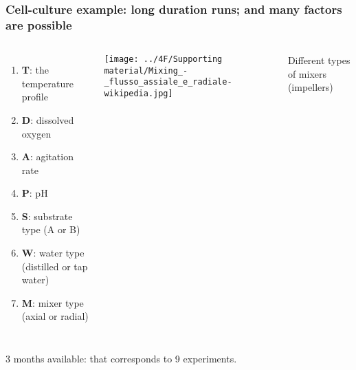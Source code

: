 \documentclass[11pt,aspectratio=169,mathserif]{beamer}
\begin{document}
\begin{frame}\frametitle{Cell-culture example: long duration runs; and many factors are possible}
	\begin{columns}[c]
			\begin{enumerate}
				\item	\textbf{T}: the temperature profile
				\item	\textbf{D}: dissolved oxygen
				\item	\textbf{A}: agitation rate
				\item	\textbf{P}: pH
				\item	\textbf{S}: substrate type (A or B)
				\item	\textbf{W}: water type (distilled or tap water)
				\item	\textbf{M}: mixer type (axial or radial)
		
			\end{enumerate}
		
			
			
			\vspace{0.2cm}
			
			\centerline{\texttt{[image: ../4F/Supporting material/Mixing\_-\_flusso\_assiale\_e\_radiale-wikipedia.jpg]}}
			
			{\color{blue} \small Different types of mixers (impellers)} 
	\end{columns}

	\vfill
	3 months available: {\color{myOrange} that corresponds to 9 experiments}.
	
\end{frame}
\end{document}
